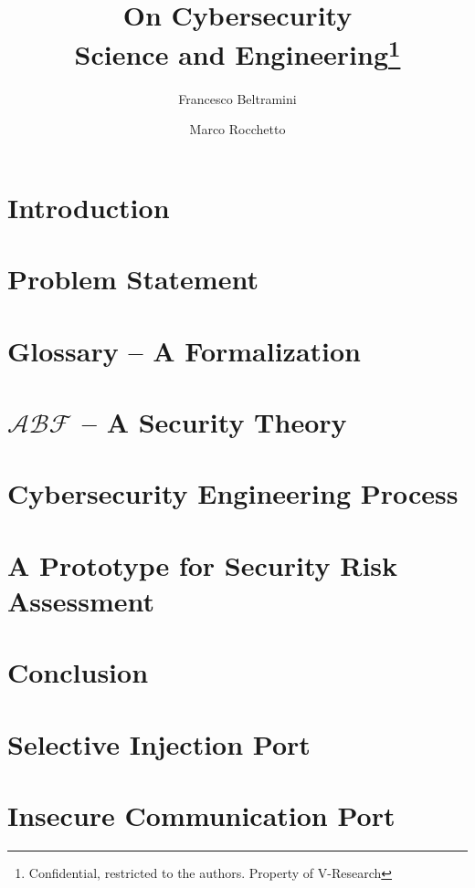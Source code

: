 \documentclass{article}
\date{}                     %
\theoremstyle{definition}
\theoremstyle{corollary}
\theoremstyle{lemma}
\theoremstyle{theorem}
\theoremstyle{theorem}
\newcommand{\assertionRegion}{\mathcal{A}}
\newcommand{\behaviorRegion}{\mathcal{B}}
\newcommand{\factRegion}{\mathcal{F}}
\begin{document}
\title{On Cybersecurity\\Science and Engineering\footnote{Confidential, restricted to the authors. Property of V-Research}}
\author[1]{Francesco Beltramini}
\author[1]{Marco Rocchetto}

\maketitle

\begin{abstract}
 
\end{abstract}
\newpage

\section{Introduction}\label{sec:intro}


\section{Problem Statement}\label{sec:problem}


\section{Glossary -- A Formalization}\label{sec:glossary}


\section{$\assertionRegion\behaviorRegion\factRegion$ -- A Security Theory}\label{sec:theory}


\section{Cybersecurity Engineering Process}\label{sec:engineering}


\section{A Prototype for Security Risk Assessment}\label{sec:tool}

\section{Conclusion}\label{sec:conclusion}

\newpage

\appendix
\section{Selective Injection Port}\label{app:selectiveinjectionport}

\section{Insecure Communication Port}\label{app:insecurecom}


\printbibliography
\end{document}
